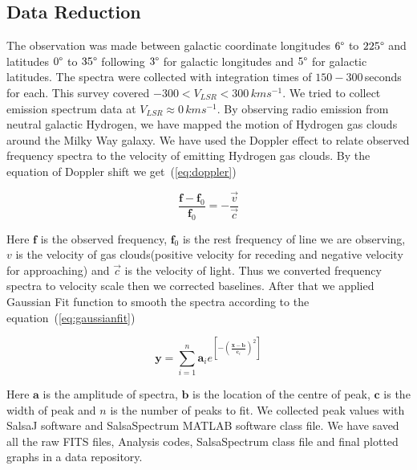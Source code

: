 \documentclass[10pt,conference]{IEEEtran}
\begin{document}
\subsection{Data Reduction}

The observation was made between galactic coordinate longitudes $6\degree$ to $225\degree$ and latitudes $0\degree$ to $35\degree$ following $3\degree$ for galactic longitudes and $5\degree$ for galactic latitudes. The spectra were collected with integration times of $150-300$\,seconds for each. This survey covered $-300<\mathit{V}_{LSR}<300$\,$kms^{-1}$. We tried to collect emission spectrum data at $\mathit{V}_{LSR}\approx 0$\,$kms^{-1}$. By observing radio emission from neutral galactic Hydrogen, we have mapped the motion of Hydrogen gas clouds around the Milky Way galaxy. We have used the Doppler effect to relate observed frequency spectra to the velocity of emitting Hydrogen gas clouds. By the equation of Doppler shift\cite{CathyHorellou2015} we get~(\ref{eq:doppler})

\begin{equation}
 \frac{\mathbf{f}-\mathbf{f}_{0}}{\mathbf{f}_{0}}=-\frac{\vec{v}}{\vec{c}}
 \label{eq:doppler}
\end{equation}

Here $\mathbf{f}$ is the observed frequency, $\mathbf{f}_{0}$ is the rest frequency of line we are observing, $\mathbf{\mathit{v}}$ is the velocity of gas clouds(positive velocity for receding and negative velocity for approaching) and $\vec{c}$ is the velocity of light. Thus we converted frequency spectra to velocity scale then we corrected baselines. After that we applied Gaussian Fit function to smooth the spectra according to the equation~(\ref{eq:gaussianfit})

\begin{equation}
  \mathbf{y}=\sum^n_{i=1}\mathbf{a}_{i}e^{\left[-\left(\frac{\mathbf{x}-\mathbf{b}}{\mathbf{c}_{i}} \right)^{2}\right]}
  \label{eq:gaussianfit}
\end{equation}

Here $\mathbf{a}$ is the amplitude of spectra, $\mathbf{b}$ is the location of the centre of peak, $\mathbf{c}$ is the width of peak and $n$ is the number of peaks to fit\cite{CathyHorellou2015}. We collected peak values with SalsaJ software and SalsaSpectrum\cite{DanielDahlin2015} MATLAB software class file. We have saved all the raw FITS files, Analysis codes, SalsaSpectrum class file and final plotted graphs in a data repository\cite{Hossain2018}.
\end{document}
